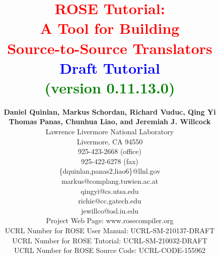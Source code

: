 \documentclass[10pt]{book}
\begin{document}
%
%

\frontmatter

\title{ {\bf \textcolor{red}{          ROSE  Tutorial: \\ 
                                     A Tool for Building \\
                                Source-to-Source Translators} \\
                             \textcolor{blue}{Draft Tutorial} \\
                               \textcolor{green}{(version 0.11.13.0)} } }

\author{ 
    {\bf Daniel Quinlan, Markus Schordan, Richard Vuduc, Qing Yi} \\
    {\bf Thomas Panas, Chunhua Liao, and Jeremiah J. Willcock} \\
         Lawrence Livermore National Laboratory \\ 
         Livermore, CA  94550 \\
         925-423-2668 (office) \\
         925-422-6278 (fax) \\
         \{dquinlan,panas2,liao6\}@llnl.gov \\
          markus@complang.tuwien.ac.at \\
          qingyi@cs.utsa.edu \\
          richie@cc.gatech.edu \\
          jewillco@osl.iu.edu \\
         Project Web Page: www.rosecompiler.org \\
         UCRL Number for ROSE User Manual: UCRL-SM-210137-DRAFT \\
         UCRL Number for ROSE Tutorial: UCRL-SM-210032-DRAFT \\
         UCRL Number for ROSE Source Code: UCRL-CODE-155962 \\
          \\
          \\
       }
\end{document}

